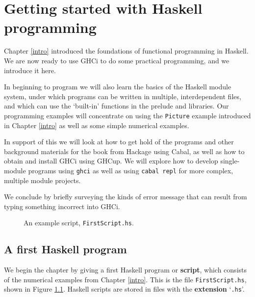 %


\chapter{Getting started with Haskell programming}
\label{getStart}
\chapstart

\medskip
Chapter \ref{intro} introduced the foundations of functional programming in Haskell.
We are now ready to use GHCi to do some practical programming, and we introduce it here.

In beginning to program we will also learn the basics of the Haskell module 
system, under which programs can be written in multiple, interdependent files, 
and which can use the `built-in' functions in the prelude and libraries. 
Our programming
examples will concentrate on using the \texttt{Picture} example
introduced in Chapter \ref{intro} as well as some simple numerical
examples. 

In support of this we will look at how to get hold of the programs and
other background materials for the book from Hackage using Cabal, as well as how to obtain and install GHCi using GHCup. We will explore how to develop single-module programs using \texttt{ghci} as well as using \texttt{cabal repl} for more complex, multiple module projects.

We conclude by briefly surveying the kinds of error message that can
result from typing something incorrect into GHCi. 

\begin{figure}[t]
\begin{alltt}

\end{alltt}
\vspace*{-12pt}
\caption{An example script, \texttt{FirstScript.hs}.}
\label{FirstScript}
\end{figure}

\section[A first Haskell program]{A first Haskell program}
 
We begin the chapter by giving a first Haskell program or
\textbf{script}, which consists of the numerical examples from
Chapter \ref{intro}. This is the file
\texttt{FirstScript.hs}, shown in Figure \ref{FirstScript}. Haskell scripts are stored in files with the \textbf{extension}
`\texttt{.hs}'.






